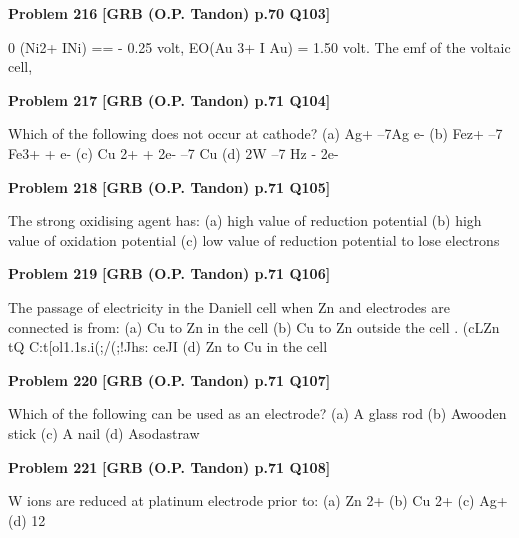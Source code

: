 \begin{problembox}
\textbf{Problem 216} \hfill \textbf{[GRB (O.P. Tandon) p.70 Q103]}
\label{q:ext-grb_all_questions-216}

 0 (Ni2+ INi) == - 0.25 volt, EO(Au 3+ I Au) = 1.50 volt. The 
emf of the voltaic cell,
\end{problembox}

\begin{problembox}
\textbf{Problem 217} \hfill \textbf{[GRB (O.P. Tandon) p.71 Q104]}
\label{q:ext-grb_all_questions-217}

Which of the following does not occur at cathode? 
(a) Ag+ --7Ag e-
(b) Fez+ --7 Fe3+ + e-
(c) Cu 2+ + 2e- --7 Cu 
(d) 2W --7 Hz - 2e-
\end{problembox}

\begin{problembox}
\textbf{Problem 218} \hfill \textbf{[GRB (O.P. Tandon) p.71 Q105]}
\label{q:ext-grb_all_questions-218}

The strong oxidising agent has: 
(a) high value of reduction potential 
(b) high value of oxidation potential 
(c) low value of reduction potential 
to lose electrons
\end{problembox}

\begin{problembox}
\textbf{Problem 219} \hfill \textbf{[GRB (O.P. Tandon) p.71 Q106]}
\label{q:ext-grb_all_questions-219}

The passage of electricity in the Daniell cell when Zn and 
electrodes are connected is from: 
(a) Cu to Zn in the cell 
(b) Cu to Zn outside the cell 
. (cLZn tQ C:t[ol1.1s.i(;/(;!Jhs: ceJI 
(d) Zn to Cu in the cell
\end{problembox}

\begin{problembox}
\textbf{Problem 220} \hfill \textbf{[GRB (O.P. Tandon) p.71 Q107]}
\label{q:ext-grb_all_questions-220}

Which of the following can be used as an electrode? 
(a) A glass rod 
(b) Awooden stick 
(c) A nail 
(d) Asodastraw
\end{problembox}

\begin{problembox}
\textbf{Problem 221} \hfill \textbf{[GRB (O.P. Tandon) p.71 Q108]}
\label{q:ext-grb_all_questions-221}

W ions are reduced at platinum electrode prior to: 
(a) Zn 2+ 
(b) Cu 2+ 
(c) Ag+ 
(d) 12
\end{problembox}

